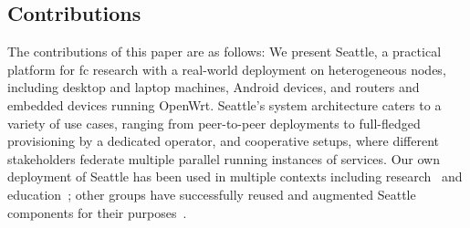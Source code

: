 \subsection{Contributions}

The contributions of this paper are as follows:
We present Seattle, a practical platform for \gls{fc} research
with a real-world deployment on heterogeneous nodes,
including desktop and laptop machines, Android devices,
and routers and embedded devices running OpenWrt.
Seattle's system architecture caters to a variety of use cases,
ranging from peer-to-peer deployments to full-fledged
provisioning by a dedicated operator, and cooperative setups,
where different stakeholders federate multiple parallel running
instances of services.
Our own deployment of Seattle has been used in multiple contexts
including research~\cite{li2015fence,rafetseder2013sensorium,zhuang2014sensibility,Eisl1010:Service,Tuts1010:Sustained,collares2011smart,zhuang2015privacy,cappos2014blursense,7133607} and education~\cite{Wallace_CCSC_2011,Cappos_CCSCCP_2010,Cappos_CCSCNW_2009,Cappos_SIGCSE_2014,Hooshangi_SIGCSE_2015};
other groups have successfully reused and augmented Seattle components
for their purposes~\cite{chard2010social,chard12ssc,caton2014social,muller2014tomato,tomato,eittenberger2012doubtless,zhuang2012distributed,zhuang2014taking,tredger2013building}.
